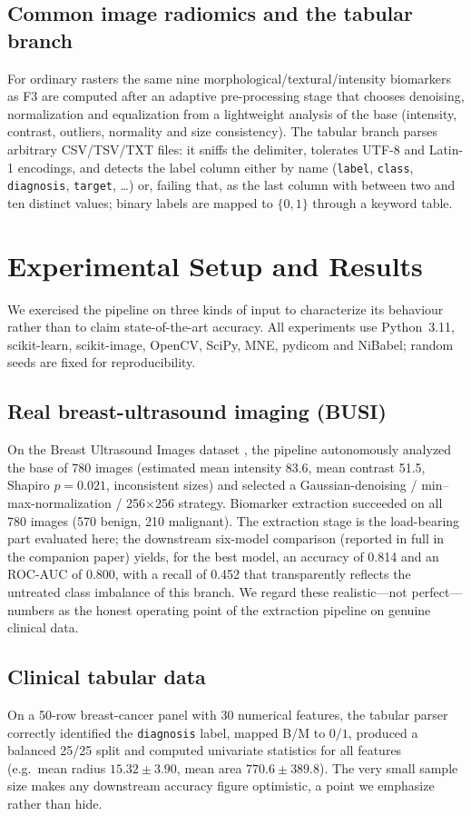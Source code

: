\documentclass[10pt,twocolumn]{article}
\begin{document}
\subsection{Common image radiomics and the tabular branch}
For ordinary rasters the same nine morphological/textural/intensity biomarkers
as F3 are computed after an adaptive pre-processing stage that chooses denoising,
normalization and equalization from a lightweight analysis of the base
(intensity, contrast, outliers, normality and size consistency). The tabular
branch parses arbitrary CSV/TSV/TXT files: it sniffs the delimiter, tolerates
UTF-8 and Latin-1 encodings, and detects the label column either by name
(\texttt{label}, \texttt{class}, \texttt{diagnosis}, \texttt{target}, \dots) or,
failing that, as the last column with between two and ten distinct values;
binary labels are mapped to $\{0,1\}$ through a keyword table.

\section{Experimental Setup and Results}
We exercised the pipeline on three kinds of input to characterize its behaviour
rather than to claim state-of-the-art accuracy. All experiments use Python~3.11,
scikit-learn, scikit-image, OpenCV, SciPy, MNE, pydicom and NiBabel; random
seeds are fixed for reproducibility.

\subsection{Real breast-ultrasound imaging (BUSI)}
On the Breast Ultrasound Images dataset \cite{aldhabyani2020busi}, the pipeline
autonomously analyzed the base of 780 images (estimated mean intensity 83.6,
mean contrast 51.5, Shapiro $p{=}0.021$, inconsistent sizes) and selected a
Gaussian-denoising / min--max-normalization / 256$\times$256 strategy. Biomarker
extraction succeeded on all 780 images (570 benign, 210 malignant). The
extraction stage is the load-bearing part evaluated here; the downstream
six-model comparison (reported in full in the companion paper) yields, for the
best model, an accuracy of 0.814 and an ROC-AUC of 0.800, with a recall of
0.452 that transparently reflects the untreated class imbalance of this branch.
We regard these realistic---not perfect---numbers as the honest operating point
of the extraction pipeline on genuine clinical data.

\subsection{Clinical tabular data}
On a 50-row breast-cancer panel with 30 numerical features, the tabular parser
correctly identified the \texttt{diagnosis} label, mapped B/M to $0/1$, produced
a balanced 25/25 split and computed univariate statistics for all features
(e.g.\ mean radius $15.32\pm3.90$, mean area $770.6\pm389.8$). The very small
sample size makes any downstream accuracy figure optimistic, a point we
emphasize rather than hide.
\end{document}
